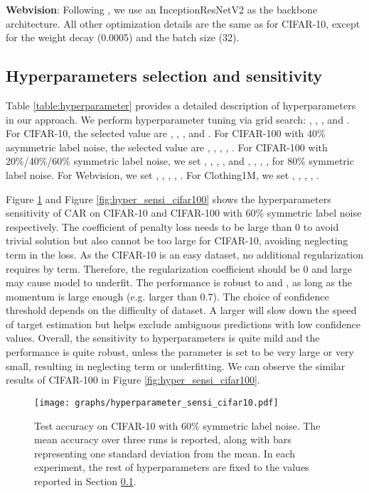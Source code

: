 \documentclass{article}
\begin{document}
\textbf{Webvision}: Following \cite{li2020dividemix,liu2020early}, we use an InceptionResNetV2 as the backbone architecture. All other optimization details are the same as for CIFAR-10, except for the weight decay (0.0005) and the batch size (32).


\subsection{Hyperparameters selection and sensitivity}
\label{sec:hyper_sensi}
Table \ref{table:hyperparameter} provides a detailed description of hyperparameters in our approach. We perform hyperparameter tuning via grid search: , , ,  and . For CIFAR-10, the selected value are , , ,  and . For CIFAR-100 with 40\% asymmetric label noise, the selected value are , , , , . For CIFAR-100 with 20\%/40\%/60\% symmetric label noise, we set , , , ,  and , , , ,  for 80\% symmetric label noise. For Webvision, we set  , , , , . For Clothing1M, we set  , , , , .

Figure \ref{fig:hyper_sensi} and Figure \ref{fig:hyper_sensi_cifar100} shows the hyperparameters sensitivity of CAR on CIFAR-10 and CIFAR-100 with 60\% symmetric label noise respectively. The coefficient of penalty loss  needs to be large than 0 to avoid trivial solution but also cannot be too large for CIFAR-10, avoiding neglecting  term in the loss. As the CIFAR-10 is an easy dataset, no additional regularization requires by  term. Therefore, the regularization coefficient  should be 0 and large  may cause model to underfit. The performance is robust to  and , as long as the momentum  is large enough (e.g. larger than 0.7). The choice of confidence threshold  depends on the difficulty of dataset. A larger  will slow down the speed of target estimation but helps exclude ambiguous predictions with low confidence values. Overall, the sensitivity to hyperparameters is quite mild and the performance is quite robust, unless the parameter is set to be very large or very small, resulting in neglecting  term or underfitting. We can observe the similar results of CIFAR-100 in Figure \ref{fig:hyper_sensi_cifar100}.




\begin{figure}[t]
	\begin{center}
		\texttt{[image: graphs/hyperparameter\_sensi\_cifar10.pdf]}
	\end{center}
	\caption{Test accuracy on CIFAR-10 with 60\% symmetric label noise. The mean accuracy over three runs is reported, along with bars representing one standard deviation from the mean. In each experiment, the rest of hyperparameters are fixed to the values reported in Section \ref{sec:hyper_sensi}.}
	\label{fig:hyper_sensi}
\end{figure}
\end{document}
